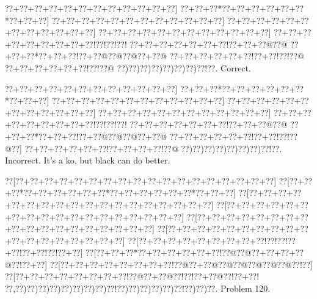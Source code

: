 \documentclass[a5paper]{article}
\begin{document}
\begin{center}
{\goo
\0??+\0??+\0??+\0??+\0??+\0??+\0??+\0??+\0??+\0??+\0??+\0??]
\0??+\0??+\0??*\0??+\0??+\0??+\0??+\0??+\0??*\0??+\0??+\0??]
\0??+\0??+\0??+\0??+\0??+\0??+\0??+\0??+\0??+\0??+\0??+\0??]
\0??+\0??+\0??+\0??+\0??+\0??+\0??+\0??+\0??+\0??+\0??+\0??]
\0??+\0??+\0??+\0??+\0??+\0??+\0??+\0??+\0??+\0??+\0??+\0??]
\0??+\0??+\0??+\0??+\0??+\0??+\0??+\0??+\0??!\0??!\0??!\0??!
\0??+\0??+\0??+\0??+\0??+\0??+\0??!\0??+\0??+\0??@\0??@
\0??+\0??+\0??*\0??+\0??+\0??!\0??+\0??@\0??@\0??@\0??+\0??@
\0??+\0??+\0??+\0??+\0??+\0??!\0??+\0??!\0??!\0??@
\0??+\0??+\0??+\0??+\0??+\0??!\0??!\0??@
\0??)\0??)\0??)\0??)\0??)\0??)\0??)\0??!\0??.
}
Correct. 

\end{center}
\begin{center}
{\goo
\0??+\0??+\0??+\0??+\0??+\0??+\0??+\0??+\0??+\0??+\0??+\0??]
\0??+\0??+\0??*\0??+\0??+\0??+\0??+\0??+\0??*\0??+\0??+\0??]
\0??+\0??+\0??+\0??+\0??+\0??+\0??+\0??+\0??+\0??+\0??+\0??]
\0??+\0??+\0??+\0??+\0??+\0??+\0??+\0??+\0??+\0??+\0??+\0??]
\0??+\0??+\0??+\0??+\0??+\0??+\0??+\0??+\0??+\0??+\0??+\0??]
\0??+\0??+\0??+\0??+\0??+\0??+\0??+\0??+\0??!\0??!\0??!\0??!
\0??+\0??+\0??+\0??+\0??+\0??+\0??!\0??+\0??+\0??@\0??@
\0??+\0??+\0??*\0??+\0??+\0??!\0??+\0??@\0??@\0??@\0??+\0??@
\0??+\0??+\0??+\0??+\0??+\0??!\0??+\0??!\0??!\0??@\0??]
\0??+\0??+\0??+\0??+\0??+\0??!\0??+\0??+\0??+\0??!\0??@
\0??)\0??)\0??)\0??)\0??)\0??)\0??)\0??!\0??.
}
Incorrect. It's a ko, but black can do better.

\end{center}
\newpage
\begin{center}
{\goo
\0??[\0??+\0??+\0??+\0??+\0??+\0??+\0??+\0??+\0??+\0??+\0??+\0??+\0??+\0??+\0??+\0??+\0??+\0??]
\0??[\0??+\0??+\0??*\0??+\0??+\0??+\0??+\0??+\0??*\0??+\0??+\0??+\0??+\0??+\0??*\0??+\0??+\0??]
\0??[\0??+\0??+\0??+\0??+\0??+\0??+\0??+\0??+\0??+\0??+\0??+\0??+\0??+\0??+\0??+\0??+\0??+\0??]
\0??[\0??+\0??+\0??+\0??+\0??+\0??+\0??+\0??+\0??+\0??+\0??+\0??+\0??+\0??+\0??+\0??+\0??+\0??]
\0??[\0??+\0??+\0??+\0??+\0??+\0??+\0??+\0??+\0??+\0??+\0??+\0??+\0??+\0??+\0??+\0??+\0??+\0??]
\0??[\0??+\0??+\0??+\0??+\0??+\0??+\0??+\0??+\0??+\0??+\0??+\0??+\0??+\0??+\0??+\0??+\0??+\0??]
\0??[\0??+\0??+\0??+\0??+\0??+\0??+\0??+\0??+\0??!\0??!\0??!\0??+\0??!\0??+\0??!\0??!\0??+\0??]
\0??[\0??+\0??+\0??*\0??+\0??+\0??+\0??+\0??+\0??!\0??@\0??@\0??+\0??+\0??+\0??@\0??!\0??+\0??]
\0??[\0??+\0??+\0??+\0??+\0??+\0??+\0??+\0??!\0??@\0??+\0??@\0??@\0??@\0??@\0??@\0??@\0??!\0??]
\0??[\0??+\0??+\0??+\0??+\0??+\0??+\0??+\0??!\0??@\0??+\0??@\0??!\0??!\0??+\0??@\0??!\0??+\0??!
\0??,\0??)\0??)\0??)\0??)\0??)\0??)\0??)\0??)\0??!\0??)\0??)\0??)\0??)\0??)\0??!\0??)\0??)\0??.
}
Problem 120.

\end{center}
\end{document}
